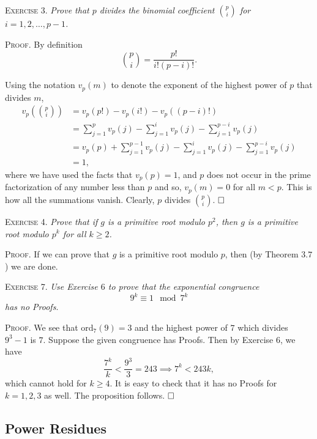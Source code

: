 \documentclass[11pt, leqno]{article}
\newcommand{\done}{\ensuremath{\hfill\square}}
\begin{document}
\textsc{Exercise 3}. \emph{Prove that $p$ divides the binomial coefficient $\binom{p}{i} $ for $i=1,2,\ldots, p-1$.}

\textsc{Proof}. By definition 
\begin{displaymath}
\binom{p}{i} = \frac{p!}{i!(p-i)!}.
\end{displaymath}

Using the notation $v_p(m)$ to denote the exponent of the highest power of $p$ that divides $m$, 
\begin{align*}
  v_p(\binom{p}{i}) &= v_p(p!) - v_p(i!) - v_p((p-i)!) \\
                    &= \sum_{j=1}^p v_p(j) - \sum_{j=1}^i v_p(j) - \sum_{j=1}^{p-i} v_p(j) \\
                    &= v_p(p) + \sum_{j=1}^{p-1} v_p(j) - \sum_{j=1}^i v_p(j) - \sum_{j=1}^{p-i} v_p(j) \\
                    &= 1,
\end{align*}
where we have used the facts that $v_p(p) = 1$, and $p$ does not occur in the prime factorization of any number less than $p$ and so, $v_p(m) = 0$ for all $m < p$. This is how all the summations vanish. Clearly, $p$ divides $\binom{p}{i}$. \done

\textsc{Exercise 4}. \emph{Prove that if $g$ is a primitive root modulo $p^2$, then $g$ is a primitive root modulo $p^k$ for all $k\geq 2$.}

\textsc{Proof}. If we can prove that $g$ is a primitive root modulo $p$, then (by Theorem $3.7$) we are done.

\textsc{Exercise 7}. \emph{Use Exercise $6$ to prove that the exponential congruence 
\begin{displaymath}
9^k \equiv 1 \mod 7^k
\end{displaymath}
has no Proofs}.

\textsc{Proof.} We see that ord$_7(9) = 3$ and the highest power of $7$ which divides $9^3-1$ is $7$. Suppose the given congruence has Proofs. Then by Exercise $6$, we have 
\begin{displaymath}
\frac{7^k}{k} < \frac{9^3}{3} = 243 \implies 7^k < 243k,
\end{displaymath}
which cannot hold for $k\geq 4$. It is easy to check that it has no Proofs for $k=1,2,3$ as well. The proposition follows. \done

\subsection{Power Residues}
\end{document}
